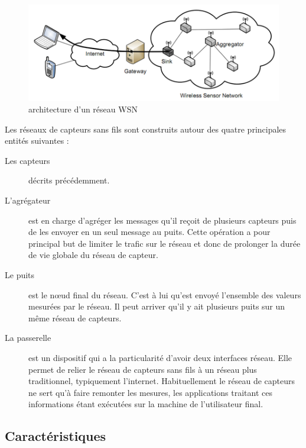 \begin{figure}[h]
\centering
\includegraphics[scale=0.5]{Intro/archiWSN}
\caption{\label{archiWSN} architecture d’un réseau WSN}
\end{figure}

Les réseaux de capteurs sans fils sont construits autour des quatre principales entités suivantes :

\begin{description}
\item[Les capteurs] décrits précédemment.

\item[L’agrégateur] est en charge d’agréger les messages qu’il reçoit de plusieurs capteurs puis de les envoyer en un seul message au puits. Cette opération a pour principal but de limiter le trafic sur le réseau et donc de prolonger la durée de vie globale du réseau de capteur.

\item[Le puits] est le nœud final  du réseau. C’est à lui qu’est  envoyé l’ensemble des valeurs mesurées par le réseau.  Il peut arriver qu’il y ait plusieurs puits sur un même réseau de capteurs.

\item[La passerelle] est un dispositif qui a la particularité d’avoir deux interfaces réseau. Elle permet de relier le réseau de capteurs  sans fils  à un réseau plus traditionnel, typiquement l’internet. Habituellement  le réseau de capteurs  ne sert  qu’à  faire remonter les 
mesures, les applications traitant ces informations étant exécutées sur la machine 
de l’utilisateur final.
\end{description}



\subsection{Caractéristiques}

